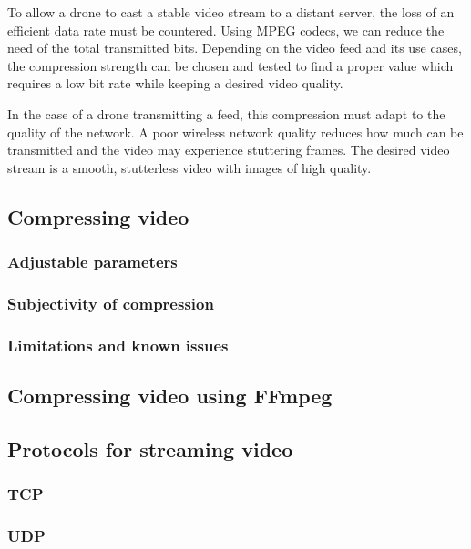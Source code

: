 To allow a drone to cast a stable video stream to a distant server, the loss of an efficient data rate must be countered. Using MPEG codecs, we can reduce the need of the total transmitted bits. Depending on the video feed and its use cases, the compression strength can be chosen and tested to find a proper value which requires a low bit rate while keeping a desired video quality.

In the case of a drone transmitting a feed, this compression must adapt to the quality of the network. A poor wireless network quality reduces how much can be transmitted and the video may experience stuttering frames. The desired video stream is a smooth, stutterless video with images of high quality. 

\subsection{Compressing video}

\subsubsection{Adjustable parameters}

\subsubsection{Subjectivity of compression}

\subsubsection{Limitations and known issues}

\subsection{Compressing video using FFmpeg}

\subsection{Protocols for streaming video}

\subsubsection{TCP}

\subsubsection{UDP}




